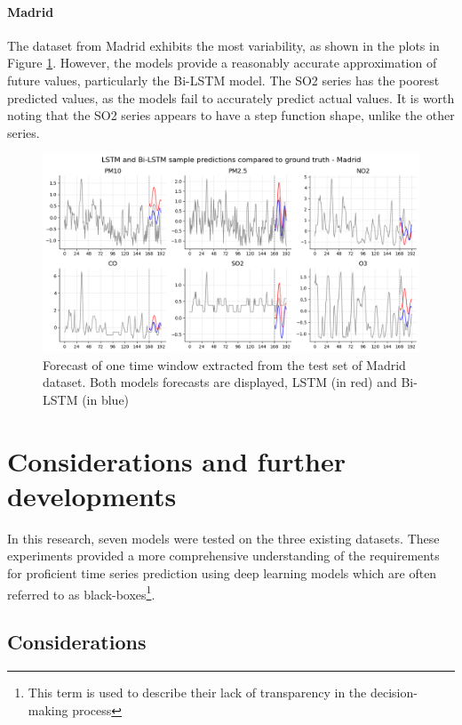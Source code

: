 \paragraph{Madrid}
The dataset from Madrid exhibits the most variability, as shown in the plots in Figure \ref{fig:forecasts_Madrid}. However, the models provide a reasonably accurate approximation of future values, particularly the Bi-LSTM model. The SO2 series has the poorest predicted values, as the models fail to accurately predict actual values. It is worth noting that the SO2 series appears to have a step function shape, unlike the other series.

\begin{figure}[h]
    \centering
    \includegraphics[width=1\linewidth]{images/forecasts_madrid.png}
    \caption{Forecast of one time window extracted from the test set of Madrid dataset. Both models forecasts are displayed, LSTM (in red) and Bi-LSTM (in blue)}
    \label{fig:forecasts_Madrid}
\end{figure}

\section{Considerations and further developments}

In this research, seven models were tested on the three existing datasets. These experiments provided a more comprehensive understanding of the requirements for proficient time series prediction using deep learning models which are often referred to as black-boxes\footnote{This term is used to describe their lack of transparency in the decision-making process}.

\subsection*{Considerations}

